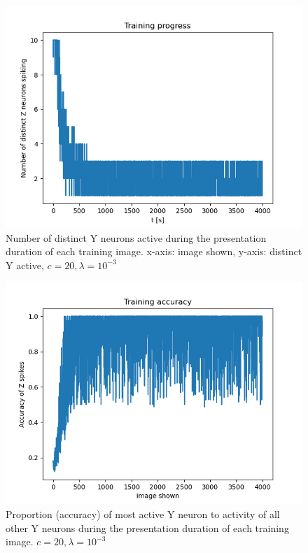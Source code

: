 \begin{figure}
  \includegraphics[width=\linewidth]{figures/angleNetwork/c20_3distinctZ.png}
  \caption{Number of distinct Y neurons active during the presentation duration of each training image. x-axis: image shown, y-axis: distinct Y active, $c = 20, \lambda = 10^{-3}$}
  \label{fig:c20_3Distinct}
\end{figure}

\begin{figure}
  \includegraphics[width=\linewidth]{figures/angleNetwork/c20_3averageZ.png}
  \caption{Proportion (accuracy) of most active Y neuron  to activity of all other Y neurons during the presentation duration of each training image. $c = 20, \lambda = 10^{-3}$}
  \label{fig:c20_3averageZ}
\end{figure}

